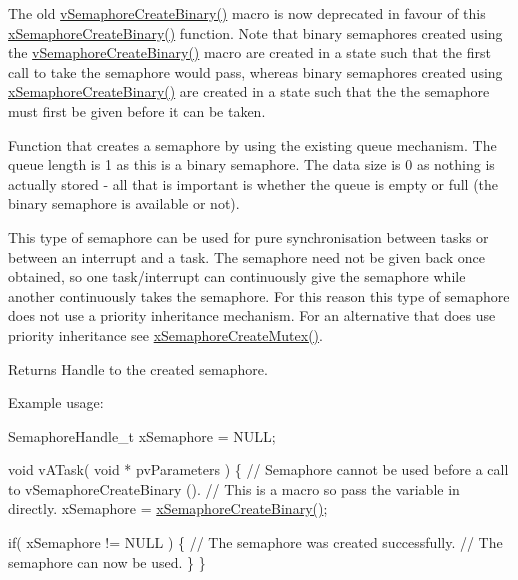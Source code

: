 The old \hyperlink{vendor_2ceedling_2plugins_2freertos_2src_2freertos_2include_2semphr_8h_ae10bffadd26fbd5bcce76bf33a83ef30}{v\+Semaphore\+Create\+Binary()} macro is now deprecated in favour of this \hyperlink{vendor_2ceedling_2plugins_2freertos_2src_2freertos_2include_2semphr_8h_acba963695e4f159d9bfa2394cae5badc}{x\+Semaphore\+Create\+Binary()} function. Note that binary semaphores created using the \hyperlink{vendor_2ceedling_2plugins_2freertos_2src_2freertos_2include_2semphr_8h_ae10bffadd26fbd5bcce76bf33a83ef30}{v\+Semaphore\+Create\+Binary()} macro are created in a state such that the first call to \textquotesingle{}take\textquotesingle{} the semaphore would pass, whereas binary semaphores created using \hyperlink{vendor_2ceedling_2plugins_2freertos_2src_2freertos_2include_2semphr_8h_acba963695e4f159d9bfa2394cae5badc}{x\+Semaphore\+Create\+Binary()} are created in a state such that the the semaphore must first be \textquotesingle{}given\textquotesingle{} before it can be \textquotesingle{}taken\textquotesingle{}.

Function that creates a semaphore by using the existing queue mechanism. The queue length is 1 as this is a binary semaphore. The data size is 0 as nothing is actually stored -\/ all that is important is whether the queue is empty or full (the binary semaphore is available or not).

This type of semaphore can be used for pure synchronisation between tasks or between an interrupt and a task. The semaphore need not be given back once obtained, so one task/interrupt can continuously \textquotesingle{}give\textquotesingle{} the semaphore while another continuously \textquotesingle{}takes\textquotesingle{} the semaphore. For this reason this type of semaphore does not use a priority inheritance mechanism. For an alternative that does use priority inheritance see \hyperlink{vendor_2ceedling_2plugins_2freertos_2src_2freertos_2include_2semphr_8h_aa6a00aa9b91a9e5b3ebe4ae1c3f115c6}{x\+Semaphore\+Create\+Mutex()}.

\begin{DoxyReturn}{Returns}
Handle to the created semaphore.
\end{DoxyReturn}
Example usage\+: 
\begin{DoxyPre}
SemaphoreHandle\_t xSemaphore = NULL;\end{DoxyPre}



\begin{DoxyPre}void vATask( void * pvParameters )
\{
   // Semaphore cannot be used before a call to vSemaphoreCreateBinary ().
   // This is a macro so pass the variable in directly.
   xSemaphore = \hyperlink{vendor_2ceedling_2plugins_2freertos_2src_2freertos_2include_2semphr_8h_acba963695e4f159d9bfa2394cae5badc}{xSemaphoreCreateBinary()};\end{DoxyPre}



\begin{DoxyPre}   if( xSemaphore != NULL )
   \{
       // The semaphore was created successfully.
       // The semaphore can now be used.
   \}
\}
\end{DoxyPre}
 